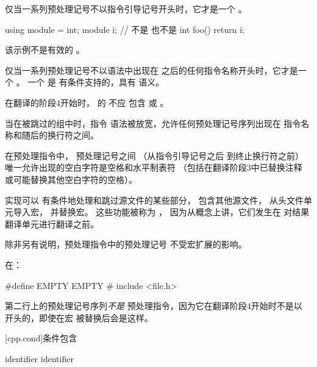 \pnum
仅当一系列预处理记号不以指令引导记号开头时，它才是一个 。
\begin{example}
\begin{codeblock}
using module = int;
module i;               // 不是  也不是 
int foo() {
  return i;
}
\end{codeblock}
该示例不是有效的 。
\end{example}
仅当一系列预处理记号不以语法中出现在 \tcode{\#} 之后的任何指令名称开头时，它才是一个 。
一个  是
有条件支持的，具有
语义。

\pnum
在翻译的阶段4开始时，
 的  不应
包含  或 。

\pnum
当在被跳过的组中时，指令
语法被放宽，允许任何预处理记号序列出现在
指令名称和随后的换行符之间。

\pnum
在预处理指令中，
预处理记号之间
（从指令引导记号之后
到终止换行符之前）
唯一允许出现的空白字符是空格和水平制表符
（包括在翻译阶段3中已替换注释
或可能替换其他空白字符的空格）。

\pnum
实现可以
有条件地处理和跳过源文件的某些部分，
包含其他源文件，
从头文件单元导入宏，
并替换宏。
这些功能被称为
，
因为从概念上讲，它们发生在
对结果翻译单元进行翻译之前。

\pnum
除非另有说明，预处理指令中的预处理记号
不受宏扩展的影响。

\begin{example}
在：
\begin{codeblock}
#define EMPTY
EMPTY   #   include <file.h>
\end{codeblock}
第二行上的预处理记号序列\textit{不是}
预处理指令，因为它在翻译阶段4开始时不是以 \tcode{\#} 开头的，即使在宏 
被替换后会是这样。
\end{example}

[cpp.cond]{条件包含}%
%

%
\begin{bnf}
\br
     identifier\br
     identifier \terminal{)}
\end{bnf}

